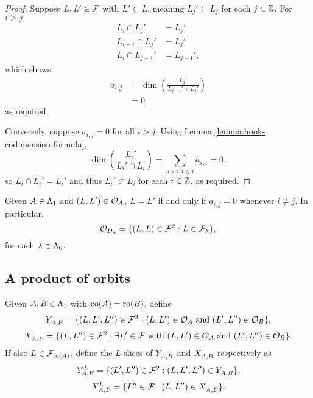 \documentclass[a4paper, 11pt, twoside]{report}
\begin{document}
\begin{proof}
Suppose $L,L'\in\flags$ with $L'\subset L$, meaning $L_j'\subset L_j$ for each $j\in\integers$. For $i>j$
\begin{align*}
L_i\cap L_j' &= L_j'\\
L_{i-1}\cap L_j' &= L_j'\\
L_i\cap L_{j-1}' &= L_{j-1}',
\end{align*}
which shows
\begin{align*}
a_{i,j}
&= \dim\left(\frac{L_j'}{L_{j-1}'+L_j'}\right)\\
&= 0
\end{align*}
as required.

Conversely, suppose $a_{i,j}=0$ for all $i>j$. Using Lemma \ref{lemma:hook-codimension-formula},
\begin{equation*}
\dim\left(\frac{L_i'}{L_i'\cap L_i}\right) = \sum_{s>i,t\le i} a_{s,t} = 0,
\end{equation*}
so $L_i\cap L_i' = L_i'$ and thus $L_i'\subset L_i$ for each $i\in\integers$, as required.
\end{proof}

\begin{corollary}\label{corollary:diagonal-orbits}
Given $A\in\matrices$ and $(L,L')\in\orbit{A}$, $L=L'$ if and only if $a_{i,j}=0$ whenever $i\neq j$. In particular,
\begin{equation*}
\orbit{\diag{\lambda}} = \{(L,L)\in\flags^2: L\in\flags_\lambda\},
\end{equation*}
for each $\lambda\in\compositions$.
\end{corollary}


\subsection{A product of orbits}

Given $A,B\in\matrices$ with $\co{A}=\ro{B}$, define
\begin{equation*}
\yprod{A,B} = \{ (L,L',L'')\in\flags^3: (L,L')\in\orbit{A} \text{ and } (L',L'')\in\orbit{B}\},
\end{equation*}
\begin{equation*}
\xprod{A,B} = \{(L,L'')\in\flags^2:\exists L'\in\flags\text{ with } (L,L')\in\orbit{A} \text{ and } (L',L'')\in\orbit{B}\}.
\end{equation*}
If also $L\in\flags_{\ro{A}}$, define the $L$-slices of $\yprod{A,B}$ and $\xprod{A,B}$ respectively as
\begin{equation*}
\yprod[L]{A,B} = \{(L',L'')\in\flags^2: (L,L',L'')\in\yprod{A,B}\},
\end{equation*}
\begin{equation*}
\xprod[L]{A,B} = \{L''\in\flags: (L,L'')\in\xprod{A,B}\}.
\end{equation*}
\end{document}
